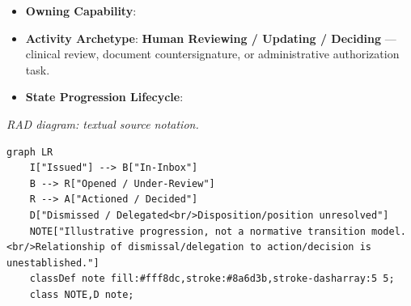 \begin{itemize}

\item 
\textbf{Owning Capability}: \texttt{}



\item 
\textbf{Activity Archetype}: \textbf{Human Reviewing /\allowbreak{} Updating /\allowbreak{} Deciding} — clinical review, document countersignature, or administrative authorization task.



\item 
\textbf{State Progression Lifecycle}:



\end{itemize}
\label{rad:processes:302}

\textit{RAD diagram: textual source notation.}
\begin{Verbatim}[breaklines,fontsize=\footnotesize]
graph LR
    I["Issued"] --> B["In-Inbox"]
    B --> R["Opened / Under-Review"]
    R --> A["Actioned / Decided"]
    D["Dismissed / Delegated<br/>Disposition/position unresolved"]
    NOTE["Illustrative progression, not a normative transition model.<br/>Relationship of dismissal/delegation to action/decision is unestablished."]
    classDef note fill:#fff8dc,stroke:#8a6d3b,stroke-dasharray:5 5;
    class NOTE,D note;
\end{Verbatim}
\label{rad:processes:312}

